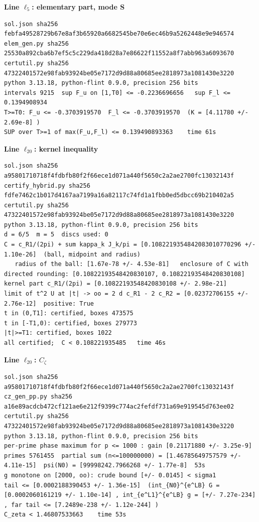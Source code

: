 \documentclass[11pt,reqno]{amsart}
\numberwithin{equation}{section}
\theoremstyle{definition}
\theoremstyle{remark}
\newcommand{\appsub}[1]{\par\medskip\noindent\textbf{#1}\par\nobreak\smallskip}
\begin{document}
\appsub{Line $\ell_{5}$: elementary part, mode S}
\begin{lstlisting}
sol.json sha256 febfa49528729b67e8af3b65920a6682545be70e6ec46b9a5262448e9e946574
elem_gen.py sha256 25530a892cba6b7ef5c5c229da418d28a7e86622f11552a8f7abb963a6093670
certutil.py sha256 47322401572e98fab93924be05e7172d9d88a80685ee2818973a1081430e3220
python 3.13.18, python-flint 0.9.0, precision 256 bits
intervals 9215  sup F_u on [1,T0] <= -0.2236696656   sup F_l <= 0.1394908934
T>=T0: F_u <= -0.3703919570  F_l <= -0.3703919570  (K = [4.11780 +/- 2.69e-8] )
SUP over T>=1 of max(F_u,F_l) <= 0.139490893363    time 61s
\end{lstlisting}
\appsub{Line $\ell_{20}$: kernel inequality}
\begin{lstlisting}
sol.json sha256 a95801710718f4fdbfb80f2f66ece1d071a440f5650c2a2ae2700fc13032143f
certify_hybrid.py sha256 fdfe7462c1b017d4167aa7199a16a82117c74fd1a1fbb0ed5dbcc69b210402a5
certutil.py sha256 47322401572e98fab93924be05e7172d9d88a80685ee2818973a1081430e3220
python 3.13.18, python-flint 0.9.0, precision 256 bits
d = 6/5  m = 5  discs used: 0 
C = c_R1/(2pi) + sum kappa_k J_k/pi = [0.1082219354842083010770296 +/- 1.10e-26]  (ball, midpoint and radius)
   radius of the ball: [1.67e-78 +/- 4.53e-81]   enclosure of C with directed rounding: [0.10822193548420830107, 0.10822193548420830108]
kernel part c_R1/(2pi) = [0.10822193548420830108 +/- 2.98e-21]
limit of t^2 U at |t| -> oo = 2 d c_R1 - 2 c_R2 = [0.02372706155 +/- 2.76e-12]  positive: True
t in (0,T1]: certified, boxes 473575
t in [-T1,0): certified, boxes 279773
|t|>=T1: certified, boxes 1022
all certified;  C < 0.108221935485   time 46s
\end{lstlisting}
\appsub{Line $\ell_{20}$: $C_\zeta$}
\begin{lstlisting}
sol.json sha256 a95801710718f4fdbfb80f2f66ece1d071a440f5650c2a2ae2700fc13032143f
cz_gen_pp.py sha256 a16e89acdcb472cf121ae6e212f9399c774ac2fefdf731a69e919545d763ee02
certutil.py sha256 47322401572e98fab93924be05e7172d9d88a80685ee2818973a1081430e3220
python 3.13.18, python-flint 0.9.0, precision 256 bits
per-prime phase maximum for p <= 1000 : gain [0.21171880 +/- 3.25e-9]
primes 5761455  partial sum (n<=100000000) = [1.46785649757579 +/- 4.11e-15]  psi(N0) = [99998242.7966268 +/- 1.77e-8]  53s
g monotone on [2000, oo): crude bound [+/- 0.0145] < sigma1
tail <= [0.0002188390453 +/- 1.36e-15]  (int_{N0}^{e^LB} G = [0.0002060161219 +/- 1.10e-14] , int_{e^L1}^{e^LB} g = [+/- 7.27e-234] , far tail <= [7.2489e-238 +/- 1.12e-244] )
C_zeta < 1.46807533663    time 53s
\end{lstlisting}
\end{document}
